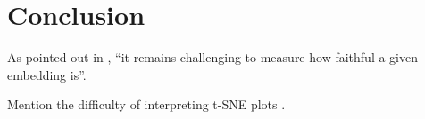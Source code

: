 \chapter{Conclusion}\label{chapter:conclusion}

As pointed out in \cite{kobak21}, \enquote{it remains challenging to measure how faithful a given embedding is}.  


Mention the difficulty of interpreting t-SNE plots \cite{Wa16Distill}. 